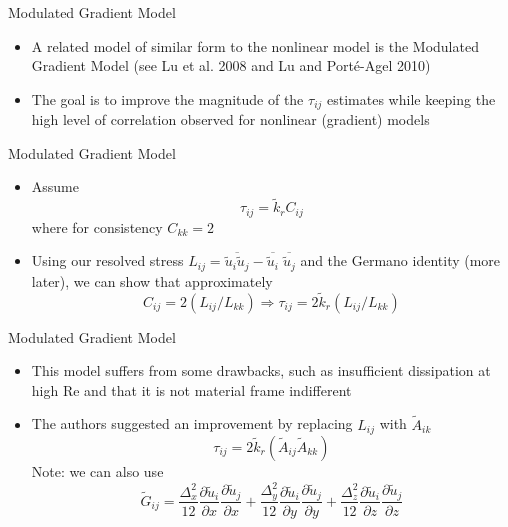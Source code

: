 \begin{frame}{Modulated Gradient Model}
    \begin{itemize}
	\item A related model of similar form to the nonlinear model is the Modulated Gradient Model (see Lu et al. 2008 and Lu and Port\'{e}-Agel 2010)
	\item The goal is to improve the magnitude of the $\tau_{ij}$ estimates while keeping the high level of correlation observed for nonlinear (gradient) models
\end{itemize}
\end{frame}

\begin{frame}{Modulated Gradient Model}
    \begin{itemize}
	\item Assume
	$$\tau_{ij} = \widetilde{k}_r C_{ij}$$
	where for consistency $C_{kk} = 2$
	\item Using our resolved stress $L_{ij} = \overline{\widetilde{u}_i\widetilde{u}_j} - \overline{\widetilde{u}_i}\; \overline{\widetilde{u}_j}$ and the Germano identity (more later), we can show that approximately
	$$C_{ij} = 2(L_{ij}/L_{kk}) \Rightarrow \tau_{ij} = 2\widetilde{k}_r(L_{ij}/L_{kk})$$
\end{itemize}
\end{frame}

\begin{frame}{Modulated Gradient Model}
    \begin{itemize}
	\item This model suffers from some drawbacks, such as  insufficient dissipation at high Re and that it is not material frame indifferent
	\item The authors suggested an improvement by replacing $L_{ij}$ with $\widetilde{A}_{ik}$
	$$\tau_{ij} = 2\widetilde{k}_r (\widetilde{A}_{ij} \widetilde{A}_{kk})$$
	Note: we can also use
	$$\widetilde{G}_{ij} = \frac{\Delta_x^2}{12}\frac{\partial \widetilde{u}_i}{\partial x}\frac{\partial \widetilde{u}_j}{\partial x} + \frac{\Delta_y^2}{12}\frac{\partial \widetilde{u}_i}{\partial y}\frac{\partial \widetilde{u}_j}{\partial y} + \frac{\Delta_z^2}{12}\frac{\partial \widetilde{u}_i}{\partial z}\frac{\partial \widetilde{u}_j}{\partial z}$$
\end{itemize}
\end{frame}

